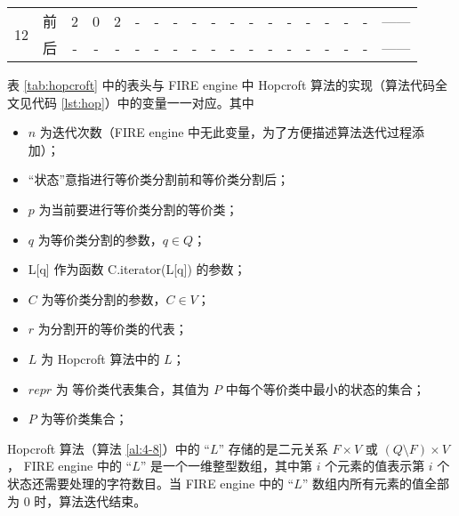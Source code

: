 \begin{table}[!htbp]
\begin{tabular}{ccccccc|cccccccccc|cl}
        \multirow{2}{*}{12}& 前 & 2 & 0 & 2 & - & -  & - & - & - & - & - & - & - & - & - & - & -             & ------ \\
                           & 后 & - & - & - & - & -  & - & - & - & - & - & - & - & - & - & - & -             & ------ \\
        \bottomrule%
    \end{tabular}
\end{table}

表 \ref{tab:hopcroft} 中的表头与 FIRE engine 中 Hopcroft 算法的实现（算法代码全文见代码 \ref{lst:hop}）中的变量一一对应。其中
\begin{itemize}
    \item $n$ 为迭代次数（FIRE engine 中无此变量，为了方便描述算法迭代过程添加）；
    \item “状态”意指进行等价类分割前和等价类分割后；
    \item $p$ 为当前要进行等价类分割的等价类；
    \item $q$ 为等价类分割的参数，$q \in Q$；
    \item L[q] 作为函数 C.iterator(L[q]) 的参数；
    \item $C$ 为等价类分割的参数，$C \in V$；
    \item $r$ 为分割开的等价类的代表；
    \item $L$ 为 Hopcroft 算法中的 $L$；
    \item $repr$ 为 等价类代表集合，其值为 $P$ 中每个等价类中最小的状态的集合；
    \item $P$ 为等价类集合；
\end{itemize}

\begin{remark}\label{rem:means-of-L}
    Hopcroft 算法（算法 \ref{al:4-8}）中的 “$L$” 存储的是二元关系 $F \times V$ 或 $(Q \setminus F) \times V$ ， FIRE engine 中的 “$L$” 是一个一维整型数组，其中第 $i$ 个元素的值表示第 $i$ 个状态还需要处理的字符数目。当 FIRE engine 中的 “$L$” 数组内所有元素的值全部为 0 时，算法迭代结束。
\end{remark}